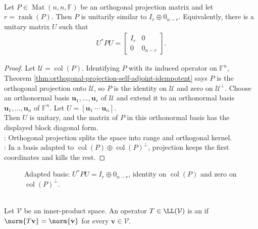 \begin{theorem} \label{thm:orthogonal-projection-matrix-unitary-coordinate-form} \\
Let $P\in\operatorname{Mat}(n,n,\mathbb{F})$ be an orthogonal projection matrix and let $r=\operatorname{rank}(P)$. Then $P$ is unitarily similar to $I_r\oplus0_{n-r}$. Equivalently, there is a unitary matrix $U$ such that
\begin{align}
U^*PU=
\begin{bmatrix}
I_r & 0\\
0 & 0_{n-r}
\end{bmatrix}. \nonumber
\end{align}
\begin{proof}
Let $\mathcal{U}=\operatorname{col}(P)$. Identifying $P$ with its induced operator on $\mathbb{F}^n$, Theorem \ref{thm:orthogonal-projection-self-adjoint-idempotent} says $P$ is the orthogonal projection onto $\mathcal{U}$, so $P$ is the identity on $\mathcal{U}$ and zero on $\mathcal{U}^{\perp}$. Choose an orthonormal basis $\mathbf{u}_1,\ldots,\mathbf{u}_r$ of $\mathcal{U}$ and extend it to an orthonormal basis $\mathbf{u}_1,\ldots,\mathbf{u}_n$ of $\mathbb{F}^n$. Let $U=[\mathbf{u}_1\ \cdots\ \mathbf{u}_n]$.\\
Then $U$ is unitary, and the matrix of $P$ in this orthonormal basis has the displayed block diagonal form.\\
: Orthogonal projection splits the space into range and orthogonal kernel.\\
: In a basis adapted to $\operatorname{col}(P)\oplus\operatorname{col}(P)^{\perp}$, projection keeps the first coordinates and kills the rest.
\end{proof}
\end{theorem}

\begin{figure}[H]
  \centering
  
  \caption{Adapted basis: $U^*PU=I_r\oplus0_{n-r}$, identity on $\operatorname{col}(P)$ and zero on $\operatorname{col}(P)^\perp$.}
  \label{fig:orthogonal-projection-unitary-block}
\end{figure}

\begin{definition} \label{def:isometry-linear-map} \\
Let $\mathcal{V}$ be an inner-product space. An operator $T\in\LL(\mathcal{V})$ is an  if $\norm{T\mathbf{v}}=\norm{\mathbf{v}}$ for every $\mathbf{v}\in\mathcal{V}$.
\end{definition}


